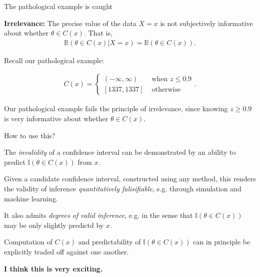 \documentclass[8pt]{beamer}\usepackage[]{graphicx}\usepackage[]{color}
\def\b#1{\mathbb{B}\left(#1\right)}
\begin{document}
\begin{frame}{The pathological example is caught}

\textbf{Irrelevance:} The precise value of the data $X=x$ is not  subjectively
informative about whether $\theta \in C(x)$.  That is,
%
\begin{align*}
%
\b{\theta \in C(x) | X = x} = \b{\theta \in C(x)}.
%
\end{align*}
%

Recall our pathological example:

\begin{align*}
%
C(x) =
\begin{cases}
    (-\infty, \infty) & \textrm{ when } z \le 0.9 \\
    [1337, 1337] & \textrm{ otherwise }
\end{cases}.
%
\end{align*}
%

Our pathological example fails the principle of irrelevance, since
knowing $z \ge 0.9$ is very informative about whether $\theta \in C(x)$.

\end{frame}



\begin{frame}{How to use this?}

The {\em invalidity} of a confidence interval can be demonstrated by an ability
to predict $\mathbb{I}(\theta \in C(x))$ from $x$.

\pause

Given a candidate confidence interval, constructed using any method, this
renders the validity of inference {\em quantitatively falisifiable}, e.g.
through simulation and machine learning.

\pause

It also admits {\em degrees of valid inference}, e.g. in the sense that
$\mathbb{I}(\theta \in C(x))$ may be only slightly
predictd by $x$.

\pause

Computation of $C(x)$ and predictability of $\mathbb{I}(\theta \in C(x))$
can in principle be explicitly traded off against one another.

\pause

\textbf{I think this is very exciting.}

\end{frame}
\end{document}
